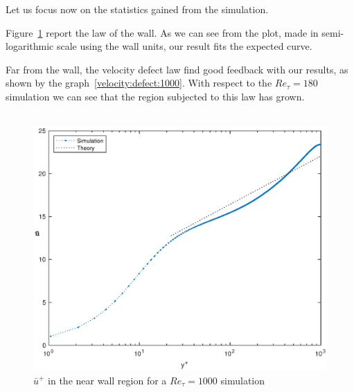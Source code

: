 Let us focus now on the statistics gained from the simulation.\par
Figure~\ref{loglaw:1000} report the law of the wall. As we can see from the plot, made in semi-logarithmic scale using the wall units, our result fits the expected curve.\par
Far from the wall, the velocity defect law find good feedback with our results, as shown by the graph~\ref{velocity:defect:1000}. With respect to the $Re_{\tau}=180$ simulation we can see that the region subjected to this law has grown.\\~\par

\begin{figure}
\begin{center}
\includegraphics[scale=0.55]{grafici/loglaw_1000.eps}
\caption{$\bar{u}^{+}$ in the near wall region for a $Re_{\tau}=1000$ simulation}
\label{loglaw:1000}
\end{center} 
\end{figure}

